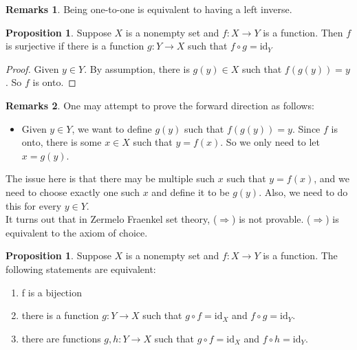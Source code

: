 \documentclass[14pt]{article}
\theoremstyle{definition}
\newtheorem*{remark}{Remarks}
\newtheorem{proposition}[definition]{Proposition}
\begin{document}
\begin{remark}
    Being one-to-one is equivalent to having a left inverse.
\end{remark}

\vspace{3mm} %

\begin{proposition}
Suppose $X$ is a nonempty set and  $f\colon X\rightarrow Y$ is a function. Then $f$ is surjective if there is a function $g\colon Y\rightarrow X$ such that $f\circ g=\mathrm{id}_Y$
\end{proposition}

\begin{proof}
    Given $y\in Y$. By assumption, there is $g(y)\in X$ such that $f(g(y))=y$. So $f$ is onto.
\end{proof}

\begin{remark}
    One may attempt to prove the forward direction as follows: 
    \begin{itemize}
        \item Given $y\in Y$, we want to define $g(y)$ such that $f(g(y))=y$. Since $f$ is onto, there is some $x\in X$ such that $y=f(x)$. So we only need to let $x=g(y)$.
    \end{itemize}
      The issue here is that there may be multiple such $x$ such that $y=f(x)$, and we need to choose exactly one such $x$ and define it to be $g(y)$. Also, we need to do this for every $y\in Y$. \\ It turns out that in Zermelo Fraenkel set theory, ($\Rightarrow$) is not provable. ($\Rightarrow$) is equivalent to the axiom of choice.
\end{remark}

\vspace{3mm} %

\begin{proposition}
    Suppose $X$ is a nonempty set and  $f\colon X\rightarrow Y$ is a function. The following statements are equivalent:
    \begin{enumerate}
        \item f is a bijection
        \item there is a function $g\colon Y\rightarrow X$ such that  $g\circ f=\mathrm{id}_X$ and $f\circ g=\mathrm{id}_Y$.
        \item there are functions $g, h\colon Y\rightarrow X$ such that $g\circ f=\mathrm{id}_X$ and $f\circ h=\mathrm{id}_Y$.
    \end{enumerate}
\end{proposition}
\end{document}
